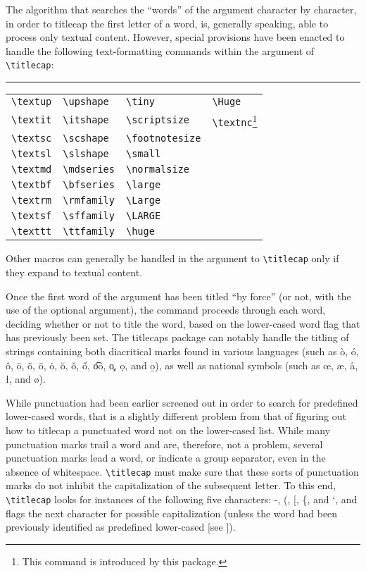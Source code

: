 \documentclass{article}
\newcommand\rl{\rule{1em}{0in}}
\def\tcp{\textsf{titlecaps}}
\def\QL{\titlecap{quirks, tricks, and limitations}}
\begin{document}
{The algorithm that searches the ``words'' of the argument character by
character, in order to titlecap the first letter of a word, is, generally
speaking, able to process only textual content.  However, special
provisions have been enacted to handle the following text-formatting
commands within the argument of \verb|\titlecap|:

\begin{minipage}{\textwidth}
\rl
\begin{tabular}{llll}
\verb|\textup| & \verb|\upshape| & \verb|\tiny| & \verb|\Huge|\\
\verb|\textit| & \verb|\itshape| & \verb|\scriptsize| &
  \verb|\textnc|\footnote{This command is introduced by this package.}\\
\verb|\textsc| & \verb|\scshape| & \verb|\footnotesize|&\\
\verb|\textsl| & \verb|\slshape| & \verb|\small|&\\
\verb|\textmd| & \verb|\mdseries| & \verb|\normalsize|&\\
\verb|\textbf| & \verb|\bfseries| & \verb|\large|&\\
\verb|\textrm| & \verb|\rmfamily| & \verb|\Large|&\\
\verb|\textsf| & \verb|\sffamily| & \verb|\LARGE|&\\
\verb|\texttt| & \verb|\ttfamily| & \verb|\huge|&\\
\end{tabular}
\end{minipage}

Other macros can generally be handled in the argument to
\verb|\titlecap| only if they expand to textual content.

Once the first word of the argument has been titled ``by force'' (or
not, with the use of the optional argument), the command proceeds
through each word, deciding whether or not to title the word, based on
the lower-cased word flag that has previously been set.  The {\tcp}
package can notably handle the titling of strings containing both
diacritical marks found in various languages (such as \`o, \'o, \^o,
\"o, \~o, \=o, \.o, \u o, \v o, \H o, \t{oo}, \c o, \d o, and \b o), as
well as national symbols (such as \oe, \ae, \aa, \l, and \o).

While punctuation had been earlier screened out in order to search for
predefined lower-cased words, that is a slightly different problem from
that of figuring out how to titlecap a punctuated word not on the
lower-cased list.  While many punctuation marks trail a word and are,
therefore, not a problem, several punctuation marks lead a word, or
indicate a group separator, even in the absence of whitespace.
\verb|\titlecap| must make sure that these sorts of punctuation marks do
not inhibit the capitalization of the subsequent letter.  To this end,
\verb|\titlecap| looks for instances of the following five characters:
-, (, [, \{, and `, and flags the next character for possible
capitalization (unless the word had been previously identified as
predefined lower-cased [see {\QL}]).

}
\end{document}
